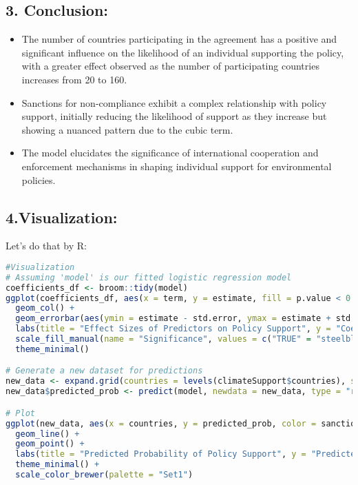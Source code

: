 \documentclass[12pt,letterpaper]{article}
\begin{document}
\subsection*{3. Conclusion:}
\begin{itemize}
   \item The number of countries participating in the agreement has a positive and significant influence on the likelihood of an individual supporting the policy, with a greater effect observed as the number of participating countries increases from 20 to 160.
   \item Sanctions for non-compliance exhibit a complex relationship with policy support, initially reducing the likelihood of support as they increase but showing a nuanced pattern due to the cubic term.
   \item The model elucidates the significance of international cooperation and enforcement mechanisms in shaping individual support for environmental policies.
\end{itemize}

\subsection*{4.Visualization:}
Let's do that by R:
\begin{lstlisting}[language=R]
#Visualization
# Assuming 'model' is our fitted logistic regression model
coefficients_df <- broom::tidy(model)
ggplot(coefficients_df, aes(x = term, y = estimate, fill = p.value < 0.05)) +
  geom_col() +
  geom_errorbar(aes(ymin = estimate - std.error, ymax = estimate + std.error), width = 0.2) +
  labs(title = "Effect Sizes of Predictors on Policy Support", y = "Coefficient Estimate", x = "") +
  scale_fill_manual(name = "Significance", values = c("TRUE" = "steelblue", "FALSE" = "grey"), labels = c("TRUE" = "Significant", "FALSE" = "Not Significant")) +
  theme_minimal()

# Generate a new dataset for predictions
new_data <- expand.grid(countries = levels(climateSupport$countries), sanctions = levels(climateSupport$sanctions))
new_data$predicted_prob <- predict(model, newdata = new_data, type = "response")

# Plot
ggplot(new_data, aes(x = countries, y = predicted_prob, color = sanctions, group = sanctions)) + # Added 'group = sanctions' here
  geom_line() +
  geom_point() +
  labs(title = "Predicted Probability of Policy Support", y = "Predicted Probability", x = "Number of Participating Countries") +
  theme_minimal() +
  scale_color_brewer(palette = "Set1")
  \end{lstlisting}
  
\end{document}
